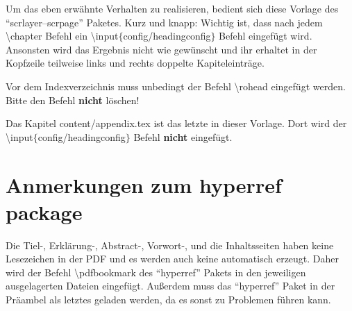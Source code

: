 			Um das eben erwähnte Verhalten zu realisieren, bedient sich diese Vorlage des \enquote{scrlayer--scrpage} Paketes. Kurz und knapp: Wichtig ist, dass nach jedem \textbackslash chapter Befehl ein \textbackslash input$\{$config/headingconfig$\}$ Befehl eingefügt wird. Ansonsten wird das Ergebnis nicht wie gewünscht und ihr erhaltet in der Kopfzeile teilweise links und rechts doppelte Kapiteleinträge.
			
			Vor dem Indexverzeichnis muss unbedingt der Befehl \textbackslash rohead eingefügt werden. Bitte den Befehl \textbf{nicht} löschen!			
			
			Das Kapitel content/appendix.tex ist das letzte in dieser Vorlage. Dort wird der \textbackslash input$\{$config/headingconfig$\}$ Befehl \textbf{nicht} eingefügt.
			
	\section{Anmerkungen zum hyperref package}
			\label{sec:anmerkungenzuhyperref}
			Die Tiel-, Erklärung-, Abstract-, Vorwort-, und die Inhaltsseiten haben keine Lesezeichen in der PDF und es werden auch keine automatisch erzeugt. Daher wird der Befehl \textbackslash pdfbookmark des \enquote{hyperref} Pakets in den jeweiligen ausgelagerten Dateien eingefügt.  
			Außerdem muss das \enquote{hyperref} Paket in der Präambel als letztes geladen werden, da es sonst zu Problemen führen kann.
	